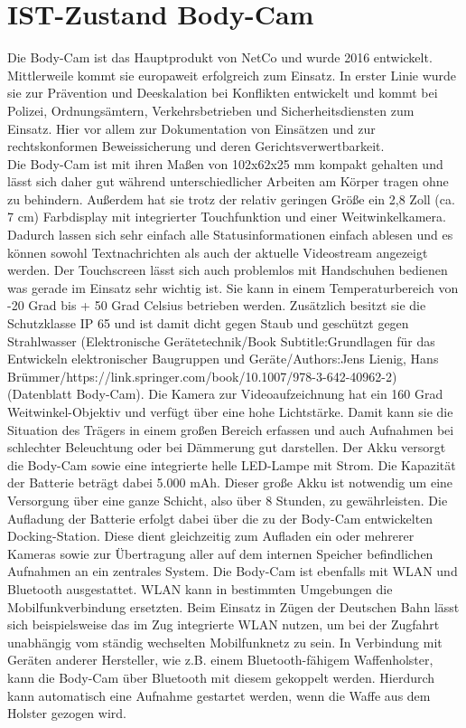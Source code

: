 \documentclass[thesis.tex]{subfiles}
\begin{document}
\section{IST-Zustand Body-Cam}

Die Body-Cam ist das Hauptprodukt von NetCo und wurde 2016 entwickelt. Mittlerweile kommt sie europaweit erfolgreich zum Einsatz.
In erster Linie wurde sie zur Prävention und Deeskalation bei Konflikten entwickelt und kommt bei Polizei, Ordnungsämtern, Verkehrsbetrieben und Sicherheitsdiensten zum Einsatz.
Hier vor allem zur Dokumentation von Einsätzen und zur rechtskonformen Beweissicherung und deren Gerichtsverwertbarkeit.
\\

Die Body-Cam ist mit ihren Maßen von 102x62x25 mm kompakt gehalten und lässt sich daher gut während unterschiedlicher Arbeiten am Körper tragen ohne zu behindern.
Außerdem hat sie trotz der relativ geringen Größe ein 2,8 Zoll (ca. 7 cm) Farbdisplay mit integrierter Touchfunktion und einer Weitwinkelkamera. Dadurch lassen sich sehr einfach alle Statusinformationen einfach ablesen und es können sowohl Textnachrichten als auch der aktuelle Videostream angezeigt werden.
Der Touchscreen lässt sich auch problemlos mit Handschuhen bedienen was gerade im Einsatz sehr wichtig ist.
Sie kann in einem Temperaturbereich von -20 Grad bis + 50 Grad Celsius betrieben werden.
Zusätzlich besitzt sie die Schutzklasse IP 65 und ist damit dicht gegen Staub und geschützt gegen Strahlwasser (Elektronische Gerätetechnik/Book Subtitle:Grundlagen für das Entwickeln elektronischer Baugruppen und Geräte/Authors:Jens Lienig, Hans Brümmer/https://link.springer.com/book/10.1007/978-3-642-40962-2) (Datenblatt Body-Cam).
Die Kamera zur Videoaufzeichnung hat ein 160 Grad Weitwinkel-Objektiv und verfügt über eine hohe Lichtstärke.
Damit kann sie die Situation des Trägers in einem großen Bereich erfassen und auch Aufnahmen bei schlechter Beleuchtung oder bei Dämmerung gut darstellen.
Der Akku versorgt die Body-Cam sowie eine integrierte helle LED-Lampe mit Strom.
Die Kapazität der Batterie beträgt dabei 5.000 mAh.
Dieser große Akku ist notwendig um eine Versorgung über eine ganze Schicht, also über 8 Stunden, zu gewährleisten.
Die Aufladung der Batterie erfolgt dabei über die zu der Body-Cam entwickelten Docking-Station.
Diese dient gleichzeitig zum Aufladen ein oder mehrerer Kameras sowie zur Übertragung aller auf dem internen Speicher befindlichen Aufnahmen an ein zentrales System.
Die Body-Cam ist ebenfalls mit WLAN und Bluetooth ausgestattet.
WLAN kann in bestimmten Umgebungen die Mobilfunkverbindung ersetzten.
Beim Einsatz in Zügen der Deutschen Bahn lässt sich beispielsweise das im Zug integrierte WLAN nutzen, um bei der Zugfahrt unabhängig vom ständig wechselten Mobilfunknetz zu sein.
In Verbindung mit Geräten anderer Hersteller, wie z.B. einem Bluetooth-fähigem Waffenholster, kann die Body-Cam über Bluetooth mit diesem gekoppelt werden.
Hierdurch kann automatisch eine Aufnahme gestartet werden, wenn die Waffe aus dem Holster gezogen wird.
\\
\end{document}
